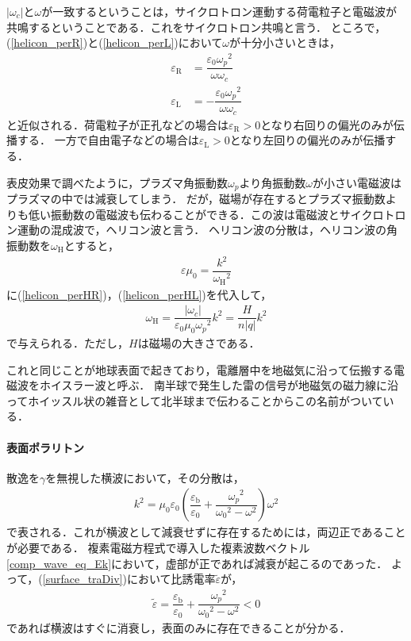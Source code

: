 $|\omega_c|$と$\omega$が一致するということは，サイクロトロン運動する荷電粒子と電磁波が共鳴するということである．これをサイクロトロン共鳴と言う．
ところで，(\ref{helicon_perR})と(\ref{helicon_perL})において$\omega$が十分小さいときは，
\begin{align}
  \varepsilon_{\text{R}} &= \dfrac{\varepsilon_0{\omega_p}^2}{\omega\omega_c}\label{helicon_perHR}\\
  \varepsilon_{\text{L}} &= -\dfrac{\varepsilon_0{\omega_p}^2}{\omega\omega_c}\label{helicon_perHL}
\end{align}
と近似される．荷電粒子が正孔などの場合は$\varepsilon_{\text{R}} > 0$となり右回りの偏光のみが伝播する．
一方で自由電子などの場合は$\varepsilon_{\text{L}} > 0$となり左回りの偏光のみが伝播する．

表皮効果で調べたように，プラズマ角振動数$\omega_p$より角振動数$\omega$が小さい電磁波はプラズマの中では減衰してしまう．
だが，磁場が存在するとプラズマ振動数よりも低い振動数の電磁波も伝わることができる．この波は電磁波とサイクロトロン運動の混成波で，ヘリコン波と言う．
ヘリコン波の分散は，ヘリコン波の角振動数を$\omega_\text{H}$とすると，
\begin{align}
  \varepsilon\mu_0=\dfrac{k^2}{{\omega_\text{H}}^2}
\end{align}
に(\ref{helicon_perHR})，(\ref{helicon_perHL})を代入して，
\begin{align}
  \omega_{\text{H}}=\dfrac{|\omega_c|}{\varepsilon_0\mu_0{\omega_p}^2}k^2=\dfrac{H}{n|q|}k^2
\end{align}
で与えられる．ただし，$H$は磁場の大きさである．

これと同じことが地球表面で起きており，電離層中を地磁気に沿って伝搬する電磁波をホイスラー波と呼ぶ．
南半球で発生した雷の信号が地磁気の磁力線に沿ってホイッスル状の雑音として北半球まで伝わることからこの名前がついている．

\paragraph{表面ポラリトン}
散逸を$\gamma$を無視した横波において，その分散は，
\begin{align}
  k^2=\mu_0\varepsilon_0\left(\dfrac{\varepsilon_{\text{b}}}{\varepsilon_0}+\dfrac{{\omega_p}^2}{{\omega_0}^2-\omega^2}\right)\omega^2
  \label{surface_traDiv}
\end{align}
で表される．これが横波として減衰せずに存在するためには，両辺正であることが必要である．
複素電磁方程式で導入した複素波数ベクトル\eqref{comp_wave_eq_Ek}において，虚部が正であれば減衰が起こるのであった．
よって，(\ref{surface_traDiv})において比誘電率$\tilde{\varepsilon}$が，
\begin{align}
  \tilde{\varepsilon}=\dfrac{\varepsilon_{\text{b}}}{\varepsilon_0}+\dfrac{{\omega_p}^2}{{\omega_0}^2-\omega^2} < 0
\end{align}
であれば横波はすぐに消衰し，表面のみに存在できることが分かる．

